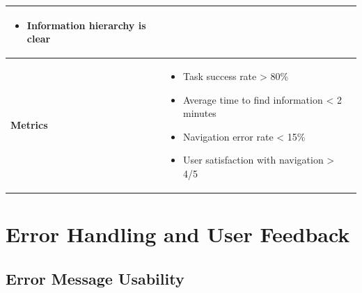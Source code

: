 \documentclass[12pt,a4paper]{article}
\begin{document}
\begin{longtable}{|p{3cm}|p{12cm}|}
\begin{itemize}[nosep]
    \item Information hierarchy is clear
\end{itemize} \\
\hline
\textbf{Metrics} & 
\begin{itemize}[nosep]
    \item Task success rate > 80\%
    \item Average time to find information < 2 minutes
    \item Navigation error rate < 15\%
    \item User satisfaction with navigation > 4/5
\end{itemize} \\
\hline
\end{longtable}

\section{Error Handling and User Feedback}

\subsection{Error Message Usability}
\end{document}
